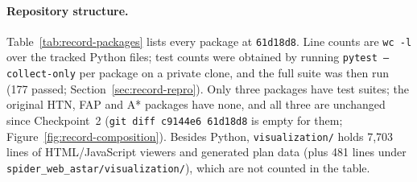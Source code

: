 \paragraph{Repository structure.}
Table~\ref{tab:record-packages} lists every package at \texttt{61d18d8}. Line counts are
\texttt{wc -l} over the tracked Python files; test counts were obtained by running
\texttt{pytest --collect-only} per package on a private clone, and the full suite was then run
(177 passed; Section~\ref{sec:record-repro}). Only three packages have test suites; the original
HTN, FAP and A* packages have none, and all three are unchanged since Checkpoint~2
(\texttt{git diff c9144e6 61d18d8} is empty for them; Figure~\ref{fig:record-composition}). Besides Python, \texttt{visualization/} holds 7,703 lines of
HTML/JavaScript viewers and generated plan data (plus 481 lines under
\texttt{spider\_\allowbreak{}web\_\allowbreak{}astar/\allowbreak{}visualization/\allowbreak{}}), which are not counted in the table.

